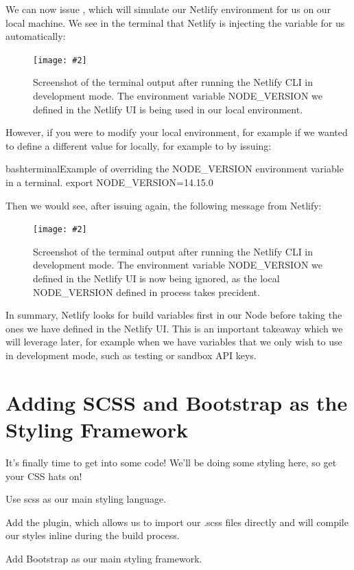 \documentclass[paper=6in:9in,pagesize=pdftex,headinclude=on,footinclude=on,12pt,twoside]{scrbook}
\newcommand{\standardfigure}[3]{\begin{figure}[H]\begin{center}\texttt{[image: \#2]}\caption{#3}\label{fig:#2}\end{center}\end{figure}}
\begin{document}

We can now issue , which will simulate our Netlify environment for us on our local machine. We see in the terminal that Netlify is injecting the  variable for us automatically:

\standardfigure{\textwidth}{frontend/netlify/netlify-injected-build-var}{Screenshot of the terminal output after running the Netlify CLI in development mode. The environment variable NODE\_VERSION we defined in the Netlify UI is being used in our local environment.}

However, if you were to modify your local environment, for example if we wanted to define a different value for  locally, for example to  by issuing:

\begin{codeInput}{bash}{terminal}{Example of overriding the NODE\_VERSION environment variable in a terminal.}
export NODE_VERSION=14.15.0
\end{codeInput}

Then we would see, after issuing  again, the following message from Netlify:

\standardfigure{\textwidth}{frontend/netlify/netlify-ignored-build-var}{Screenshot of the terminal output after running the Netlify CLI in development mode. The environment variable NODE\_VERSION we defined in the Netlify UI is now being ignored, as the local NODE\_VERSION defined in process takes precident.}

In summary, Netlify looks for build variables first in our Node  before taking the ones we have defined in the Netlify UI. This is an important takeaway which we will leverage later, for example when we have variables that we only wish to use in development mode, such as testing or sandbox API keys.

\section{Adding SCSS and Bootstrap as the Styling Framework}

It's finally time to get into some code! \partypopper We'll be doing some styling here, so get your CSS hats on!

\begin{arrows}
\item Use scss as our main styling language.
\item Add the  plugin, which allows us to import our .scss files directly and will compile our styles inline during the build process.
\item Add Bootstrap as our main styling framework.
\end{arrows}
\end{document}
